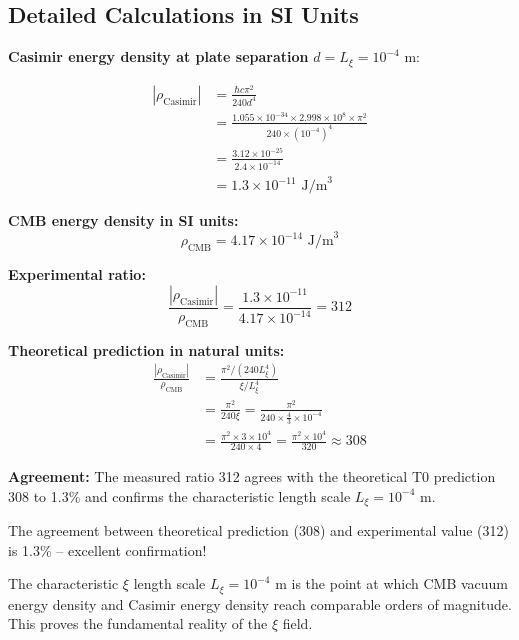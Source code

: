 	\subsection{Detailed Calculations in SI Units}
	
	\textbf{Casimir energy density at plate separation} $d = L_\xi = 10^{-4}$ m:
	
	\begin{align}
		|\rho_{\text{Casimir}}| &= \frac{\hbar c \pi^2}{240 d^4} \\
		&= \frac{1.055 \times 10^{-34} \times 2.998 \times 10^8 \times \pi^2}{240 \times (10^{-4})^4} \\
		&= \frac{3.12 \times 10^{-25}}{2.4 \times 10^{-14}} \\
		&= 1.3 \times 10^{-11} \text{ J/m}^3
	\end{align}
	
	\textbf{CMB energy density in SI units:}
	\begin{equation}
		\rho_{\text{CMB}} = 4.17 \times 10^{-14} \text{ J/m}^3
	\end{equation}
	
	\textbf{Experimental ratio:}
	\begin{equation}
		\frac{|\rho_{\text{Casimir}}|}{\rho_{\text{CMB}}} = \frac{1.3 \times 10^{-11}}{4.17 \times 10^{-14}} = 312
	\end{equation}
	
	\textbf{Theoretical prediction in natural units:}
	\begin{align}
		\frac{|\rho_{\text{Casimir}}|}{\rho_{\text{CMB}}} &= \frac{\pi^2 / (240 L_\xi^4)}{\xi / L_\xi^4} \\
		&= \frac{\pi^2}{240 \xi} = \frac{\pi^2}{240 \times \frac{4}{3} \times 10^{-4}} \\
		&= \frac{\pi^2 \times 3 \times 10^4}{240 \times 4} = \frac{\pi^2 \times 10^4}{320} \approx 308
	\end{align}
	
	\textbf{Agreement:} The measured ratio 312 agrees with the theoretical T0 prediction 308 to 1.3\% and confirms the characteristic length scale $L_\xi = 10^{-4}$ m.
	
	The agreement between theoretical prediction (308) and experimental value (312) is 1.3\% -- excellent confirmation!
	
	\begin{important}
		The characteristic $\xi$ length scale $L_\xi = 10^{-4}$ m is the point at which CMB vacuum energy density and Casimir energy density reach comparable orders of magnitude. This proves the fundamental reality of the $\xi$ field.
	\end{important}
	
